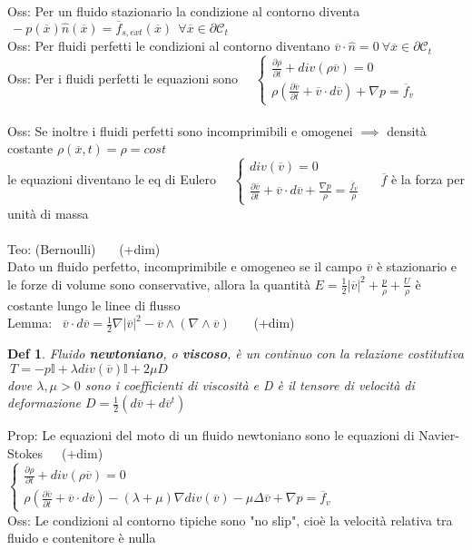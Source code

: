 \documentclass{article}
\theoremstyle{unnumbered}
\newtheorem* {theoremT}{Def}
\theoremstyle{unnumbered1}
\newenvironment{defi}{\begin{gBox}\begin{theoremT}}{\end{theoremT}\end{gBox}}
\begin{document}
%
%
Oss: Per un fluido stazionario la condizione al contorno diventa $\ -p(\overline{x})\hat{n}(\overline{x})=\overline{f}_{s,ext}(\overline{x}) \ \ \forall \overline{x}\in \partial \mathcal{C}_t$\\
%
%
Oss: Per fluidi perfetti le condizioni al contorno diventano
$\overline{v}\cdot\hat{n}=0 \ \forall \overline{x}\in\partial \mathcal{C}_t$\\
%
%
%
Oss: Per i fluidi perfetti le equazioni sono \ \ $\begin{cases}
\frac{\partial \rho}{\partial t} + div(\rho\overline{v})=0 \\
\rho(\frac{\partial\overline{v}}{\partial t} +\overline{v}\cdot d\overline{v}) +\nabla p=\overline{f}_v  \end{cases}$\\ \\
%
Oss: Se inoltre i fluidi perfetti sono incomprimibili e omogenei $\implies$ densità costante $\rho(\overline{x},t)=\rho=cost$\\
\phantom{Oss: }le equazioni diventano le eq di Eulero \ \ $\begin{cases}div(\overline{v})=0 \\ \frac{\partial\overline{v}}{\partial t} +\overline{v}\cdot d\overline{v} +\frac{\nabla p}{\rho}=\frac{\overline{f}_v}{\rho} \end{cases}$ \ \ $\overline{f}$ è la forza per unità di massa\\ \\
%
%
%
Teo: (Bernoulli) \ \ \ (+dim)\\
Dato un fluido perfetto, incomprimibile e omogeneo se il campo $\overline{v}$ è stazionario e le forze di volume sono conservative, allora la quantità $E=\frac{1}{2}|\overline{v}|^2+\frac{p}{\rho}+\frac{U}{\rho}$ è costante lungo le linee di flusso \\
%
Lemma: \ $\overline{v}\cdot d\overline{v}=\frac{1}{2}\nabla|\overline{v}|^2 -\overline{v}\wedge(\nabla\wedge\overline{v})$ \ \ \ (+dim)\\
%
%
%
\begin{defi}
Fluido \textbf{newtoniano}, o \textbf{viscoso}, è un continuo con la relazione costitutiva $\ T=-p\mathbb{I} + \lambda div(\overline{v})\mathbb{I}+2\mu D$\\
dove $\lambda, \mu >0$ sono i coefficienti di viscosità e D è il tensore di velocità di deformazione $D=\frac{1}{2}(d\overline{v}+d\overline{v}^t)$
\end{defi}
%
Prop: Le equazioni del moto di un fluido newtoniano sono le equazioni di Navier-Stokes\ \ \ (+dim)\\
\phantom{Prop: }$\begin{cases}
\frac{\partial\rho}{\partial t} + div(\rho\overline{v})=0\\
\rho(\frac{\partial\overline{v}}{\partial t}+\overline{v}\cdot d\overline{v}) -(\lambda+\mu)\nabla div(\overline{v}) -\mu\Delta\overline{v} +\nabla p = \overline{f}_v
\end{cases}$ \\
%
Oss: Le condizioni al contorno tipiche sono "no slip", cioè la velocità relativa tra fluido e contenitore è nulla\\
\end{document}
